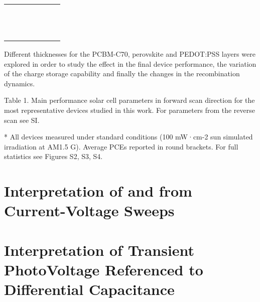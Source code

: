 \begin{tabular}{ccc|cccc}
	\rule[-1ex]{0pt}{2.5ex}  &  &  &  &  &  &  \\ 
	\rule[-1ex]{0pt}{2.5ex}  &  &  &  &  &  &  \\ 
	\hline 
	\rule[-1ex]{0pt}{2.5ex}  &  &  &  &  &  &  \\ 
	\rule[-1ex]{0pt}{2.5ex}  &  &  &  &  &  &  \\ 
	\rule[-1ex]{0pt}{2.5ex}  &  &  &  &  &  &  \\ 
	\rule[-1ex]{0pt}{2.5ex}  &  &  &  &  &  &  \\ 
	\rule[-1ex]{0pt}{2.5ex}  &  &  &  &  &  &  \\ 
	\rule[-1ex]{0pt}{2.5ex}  &  &  &  &  &  &  \\ 
	\rule[-1ex]{0pt}{2.5ex}  &  &  &  &  &  &  \\ 
	\rule[-1ex]{0pt}{2.5ex}  &  &  &  &  &  &  \\ 
	\rule[-1ex]{0pt}{2.5ex}  &  &  &  &  &  &  \\ 
	\rule[-1ex]{0pt}{2.5ex}  &  &  &  &  &  &  \\ 
\end{tabular} 


Different thicknesses for the PCBM-C70, perovskite and PEDOT:PSS layers were explored in order to study the effect in the final device performance, the variation of the charge storage capability and finally the changes in the recombination dynamics.

Table 1. Main performance solar cell parameters in forward scan direction for the most representative devices studied in this work. For parameters from the reverse scan see SI.

* All devices measured under standard conditions (100 mW·cm-2 sun simulated irradiation at AM1.5 G). Average PCEs reported in round brackets. For full statistics see Figures S2, S3, S4.







\section{Interpretation of  and  from Current-Voltage Sweeps}

\section{Interpretation of Transient PhotoVoltage Referenced to Differential Capacitance}\label{interpretation_tpvdc}

